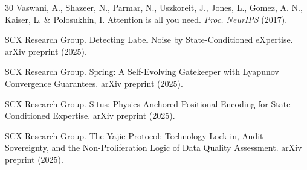 \documentclass[12pt,a4paper]{ctexart}
\begin{document}
\begin{thebibliography}{30}
 Vaswani, A., Shazeer, N., Parmar, N., Uszkoreit, J., Jones, L., Gomez, A. N., Kaiser, L. \& Polosukhin, I. Attention is all you need. \textit{Proc. NeurIPS} (2017).

 SCX Research Group. Detecting Label Noise by State-Conditioned eXpertise. arXiv preprint (2025).

 SCX Research Group. Spring: A Self-Evolving Gatekeeper with Lyapunov Convergence Guarantees. arXiv preprint (2025).

 SCX Research Group. Situs: Physics-Anchored Positional Encoding for State-Conditioned Expertise. arXiv preprint (2025).

 SCX Research Group. The Yajie Protocol: Technology Lock-in, Audit Sovereignty, and the Non-Proliferation Logic of Data Quality Assessment. arXiv preprint (2025).

\end{thebibliography}
\end{document}

